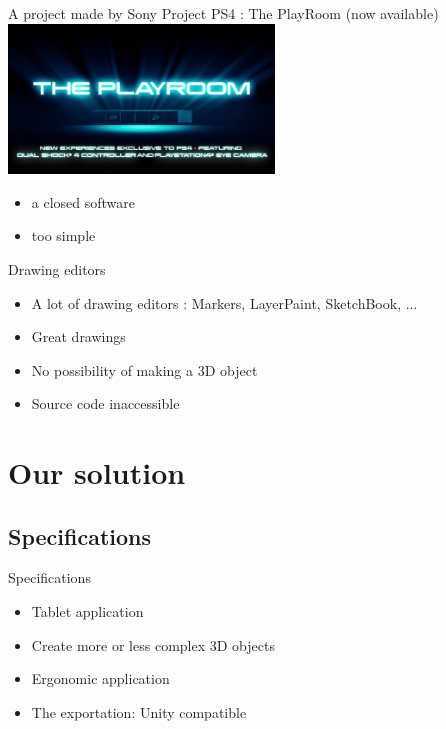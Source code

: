 \documentclass[a4paper,10pt]{beamer}
\begin{document}
		\begin{frame}{A project made by Sony}
			Project PS4 : The PlayRoom (now available)
			\href{run:Video_intro_playroom.wmv}{\includegraphics[width=200pt]{images/The-Playroom.jpg}}
			\begin{itemize}
				\item a closed software
				\item too simple
			\end{itemize}
		\end{frame}
		
			\begin{frame}{Drawing editors}
				\begin{itemize}
					\item A lot of drawing editors : Markers, LayerPaint, SketchBook, ...
					\item Great drawings
					\item No possibility of making a 3D object
					\item Source code inaccessible
				\end{itemize}
			\end{frame}
	
	\section{Our solution}
		\subsection{Specifications}
		
		\begin{frame}{Specifications}
			\begin{itemize}
				\item Tablet application
				\item Create more or less complex 3D objects
				\item Ergonomic application
				\item The exportation: Unity compatible
			\end{itemize}
		\end{frame}
		
\end{document}
